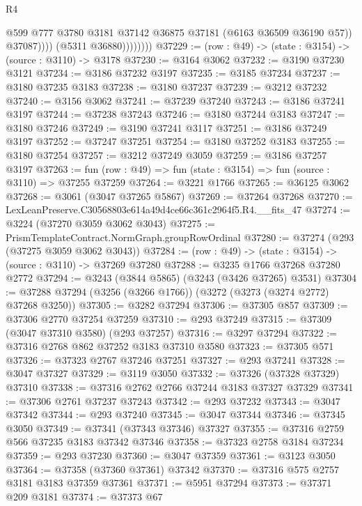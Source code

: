 \begin{lexlean}{R4}
\begin{coremodule}
                            @599
                            @777
                            @3780
                            @3181
                            @37142
                            @36875
                            @37181
                            (@6163 @36509 @36190 @57))
                          @37087))))
                  (@5311 @36880))))))))
@37229 := (row : @49) -> (state : @3154) -> (source : @3110) -> @3178
@37230 := @3164 @3062
@37232 := @3190 @37230 @3121
@37234 := @3186 @37232 @3197
@37235 := @3185 @37234
@37237 := @3180 @37235 @3183
@37238 := @3180 @37237
@37239 := @3212 @37232
@37240 := @3156 @3062
@37241 := @37239 @37240
@37243 := @3186 @37241 @3197
@37244 := @37238 @37243
@37246 := @3180 @37244 @3183
@37247 := @3180 @37246
@37249 := @3190 @37241 @3117
@37251 := @3186 @37249 @3197
@37252 := @37247 @37251
@37254 := @3180 @37252 @3183
@37255 := @3180 @37254
@37257 := @3212 @37249 @3059
@37259 := @3186 @37257 @3197
@37263 := fun (row : @49) => fun (state : @3154) => fun (source : @3110) => @37255 @37259
@37264 := @3221 @1766
@37265 := @36125 @3062
@37268 := @3061 (@3047 @37265 @5867)
@37269 := @37264 @37268
@37270 := LexLeanPreserve.C30568803e614a49d4ce66c361c2964f5.R4.__fits_47
@37274 := @3224 (@37270 @3059 @3062 @3043)
@37275 := PrismTemplateContract.NormGraph.groupRowOrdinal
@37280 := @37274 (@293 (@37275 @3059 @3062 @3043))
@37284 := (row : @49) -> (state : @3154) -> (source : @3110) -> @37269 @37280
@37288 := @3235 @1766 @37268 @37280 @2772
@37294 := @3243 (@3844 @5865) (@3243 (@3426 @37265) @3531)
@37304 := @37288 @37294 (@3256 (@3266 @1766)) (@3272 (@3273 (@3274 @2772) @37268 @3250))
@37305 := @3282 @37294
@37306 := @37305 @857
@37309 := @37306 @2770 @37254 @37259
@37310 := @293 @37249
@37315 := @37309 (@3047 @37310 @3580) (@293 @37257)
@37316 := @3297 @37294
@37322 := @37316 @2768 @862 @37252 @3183 @37310 @3580
@37323 := @37305 @571
@37326 := @37323 @2767 @37246 @37251
@37327 := @293 @37241
@37328 := @3047 @37327
@37329 := @3119 @3050
@37332 := @37326 (@37328 @37329) @37310
@37338 := @37316 @2762 @2766 @37244 @3183 @37327 @37329
@37341 := @37306 @2761 @37237 @37243
@37342 := @293 @37232
@37343 := @3047 @37342
@37344 := @293 @37240
@37345 := @3047 @37344
@37346 := @37345 @3050
@37349 := @37341 (@37343 @37346) @37327
@37355 := @37316 @2759 @566 @37235 @3183 @37342 @37346
@37358 := @37323 @2758 @3184 @37234
@37359 := @293 @37230
@37360 := @3047 @37359
@37361 := @3123 @3050
@37364 := @37358 (@37360 @37361) @37342
@37370 := @37316 @575 @2757 @3181 @3183 @37359 @37361
@37371 := @5951 @37294
@37373 := @37371 @209 @3181
@37374 := @37373 @67

\end{coremodule}
\end{lexlean}
